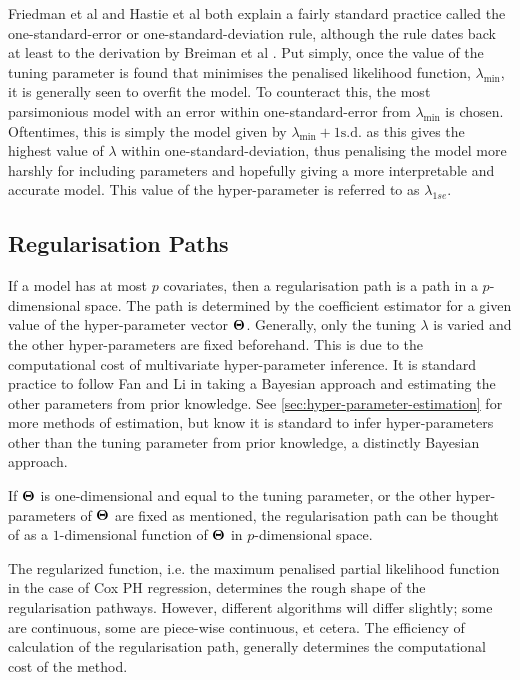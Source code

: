 Friedman et al  and Hastie et al  both explain a fairly standard practice called the one-standard-error or one-standard-deviation rule, although the rule dates back at least to the derivation by Breiman et al . Put simply, once the value of the tuning parameter is found that minimises the penalised likelihood function, $\lambda_{\min}$, it is generally seen to overfit the model. To counteract this, the most parsimonious model with an error within one-standard-error from $\lambda_{\min}$ is chosen. Oftentimes, this is simply the model given by $\lambda_{\min}+1\textrm{s.d.}$ as this gives the highest value of $\lambda$ within one-standard-deviation, thus penalising the model more harshly for including parameters and hopefully giving a more interpretable and accurate model. This value of the hyper-parameter is referred to as $\lambda_{1se}$.

\subsection{Regularisation Paths}\label{sec:regularisation-paths}

If a model has at most $p$ covariates, then a regularisation path is a path in a $p$-dimensional space. The path is determined by the coefficient estimator for a given value of the hyper-parameter vector $\boldsymbol{\Theta}$. Generally, only the tuning $\lambda$ is varied and the other hyper-parameters are fixed beforehand. This is due to the computational cost of multivariate hyper-parameter inference. It is standard practice to follow Fan and Li  in taking a Bayesian approach and estimating the other parameters from prior knowledge. See \cref{sec:hyper-parameter-estimation} for more methods of estimation, but know it is standard to infer hyper-parameters other than the tuning parameter from prior knowledge, a distinctly Bayesian approach.

If $\boldsymbol{\Theta}$ is one-dimensional and equal to the tuning parameter, or the other hyper-parameters of $\boldsymbol{\Theta}$ are fixed as mentioned, the regularisation path can be thought of as a $1$-dimensional function of $\boldsymbol{\Theta}$ in $p$-dimensional space. 

The regularized function, i.e. the maximum penalised partial likelihood function in the case of Cox PH regression, determines the rough shape of the regularisation pathways. However, different algorithms will differ slightly; some are continuous, some are piece-wise continuous, et cetera. The efficiency of calculation of the regularisation path, generally determines the computational cost of the method.

